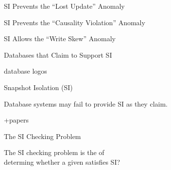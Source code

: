 \begin{frame}{SI Prevents the ``Lost Update'' Anomaly}
  \begin{center}
    

  \end{center}
\end{frame}

\begin{frame}{SI Prevents the ``Causality Violation'' Anomaly}
  \begin{center}
    
  \end{center}
\end{frame}

\begin{frame}{SI Allows the ``Write Skew'' Anomaly}
  \begin{center}
  \end{center}
\end{frame}

\begin{frame}{Databases that Claim to Support SI}
  \begin{center}
    database logos
  \end{center}
\end{frame}

\begin{frame}{Snapshot Isolation (SI)}
  \begin{center}
    Database systems may fail to provide SI as they claim.

    +papers
  \end{center}
\end{frame}

\begin{frame}{The SI Checking Problem}
  \begin{definition}
    The SI checking problem is the  of \\[5pt]
    determing whether a given  satisfies SI?
  \end{definition}

\end{frame}

